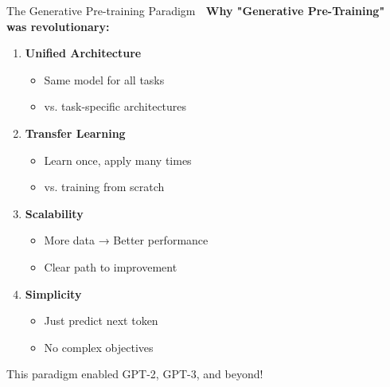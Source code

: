 \documentclass[aspectratio=169]{beamer}
\begin{document}
\begin{frame}[shrink=10]{The Generative Pre-training Paradigm 🌟}
    \textbf{Why "Generative Pre-Training" was revolutionary:}

    \vspace{0.3cm}

    \begin{enumerate}\setlength{\itemsep}{0pt}
        \item \textbf{Unified Architecture}
        \begin{itemize}\setlength{\itemsep}{0pt}
            \item Same model for all tasks
            \item vs. task-specific architectures
        \end{itemize}

        \vspace{0.3cm}

        \item \textbf{Transfer Learning}
        \begin{itemize}\setlength{\itemsep}{0pt}
            \item Learn once, apply many times
            \item vs. training from scratch
        \end{itemize}

        \vspace{0.3cm}

        \item \textbf{Scalability}
        \begin{itemize}\setlength{\itemsep}{0pt}
            \item More data → Better performance
            \item Clear path to improvement
        \end{itemize}

        \vspace{0.3cm}

        \item \textbf{Simplicity}
        \begin{itemize}\setlength{\itemsep}{0pt}
            \item Just predict next token
            \item No complex objectives
        \end{itemize}
    \end{enumerate}

    \vspace{0.3cm}

    \begin{alertblock}{This paradigm enabled GPT-2, GPT-3, and beyond!}
    \end{alertblock}
\end{frame}
\end{document}

